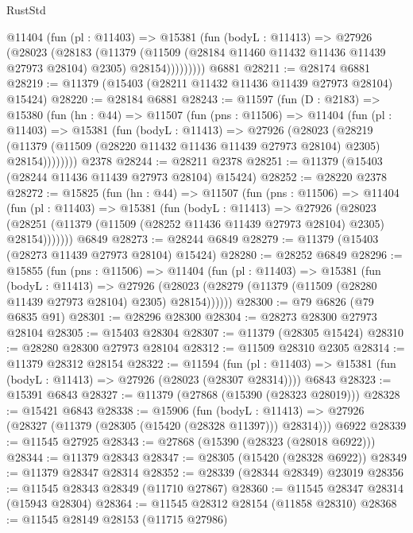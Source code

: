 \begin{lexlean}{RustStd}
\begin{coremodule}
          @11404
            (fun (pl : @11403) =>
            @15381
              (fun (bodyL : @11413) =>
              @27926
                (@28023
                  (@28183
                    (@11379
                      (@11509 (@28184 @11460 @11432 @11436 @11439 @27973 @28104) @2305)
                      @28154)))))))))
    @6881
@28211 := @28174 @6881
@28219 := @11379 (@15403 (@28211 @11432 @11436 @11439 @27973 @28104) @15424)
@28220 := @28184 @6881
@28243 := @11597
    (fun (D : @2183) =>
    @15380
      (fun (hn : @44) =>
      @11507
        (fun (pns : @11506) =>
        @11404
          (fun (pl : @11403) =>
          @15381
            (fun (bodyL : @11413) =>
            @27926
              (@28023
                (@28219
                  (@11379 (@11509 (@28220 @11432 @11436 @11439 @27973 @28104) @2305) @28154))))))))
    @2378
@28244 := @28211 @2378
@28251 := @11379 (@15403 (@28244 @11436 @11439 @27973 @28104) @15424)
@28252 := @28220 @2378
@28272 := @15825
    (fun (hn : @44) =>
    @11507
      (fun (pns : @11506) =>
      @11404
        (fun (pl : @11403) =>
        @15381
          (fun (bodyL : @11413) =>
          @27926
            (@28023
              (@28251 (@11379 (@11509 (@28252 @11436 @11439 @27973 @28104) @2305) @28154)))))))
    @6849
@28273 := @28244 @6849
@28279 := @11379 (@15403 (@28273 @11439 @27973 @28104) @15424)
@28280 := @28252 @6849
@28296 := @15855
    (fun (pns : @11506) =>
    @11404
      (fun (pl : @11403) =>
      @15381
        (fun (bodyL : @11413) =>
        @27926 (@28023 (@28279 (@11379 (@11509 (@28280 @11439 @27973 @28104) @2305) @28154))))))
@28300 := @79 @6826 (@79 @6835 @91)
@28301 := @28296 @28300
@28304 := @28273 @28300 @27973 @28104
@28305 := @15403 @28304
@28307 := @11379 (@28305 @15424)
@28310 := @28280 @28300 @27973 @28104
@28312 := @11509 @28310 @2305
@28314 := @11379 @28312 @28154
@28322 := @11594
    (fun (pl : @11403) => @15381 (fun (bodyL : @11413) => @27926 (@28023 (@28307 @28314))))
    @6843
@28323 := @15391 @6843
@28327 := @11379 (@27868 (@15390 (@28323 @28019)))
@28328 := @15421 @6843
@28338 := @15906
    (fun (bodyL : @11413) => @27926 (@28327 (@11379 (@28305 (@15420 (@28328 @11397))) @28314)))
    @6922
@28339 := @11545 @27925
@28343 := @27868 (@15390 (@28323 (@28018 @6922)))
@28344 := @11379 @28343
@28347 := @28305 (@15420 (@28328 @6922))
@28349 := @11379 @28347 @28314
@28352 := @28339 (@28344 @28349) @23019
@28356 := @11545 @28343 @28349 (@11710 @27867)
@28360 := @11545 @28347 @28314 (@15943 @28304)
@28364 := @11545 @28312 @28154 (@11858 @28310)
@28368 := @11545 @28149 @28153 (@11715 @27986)

\end{coremodule}
\end{lexlean}
